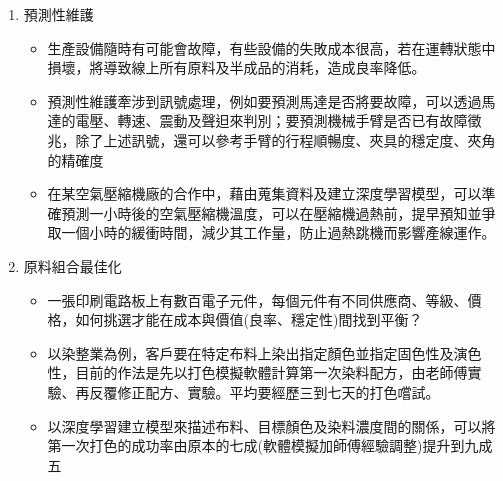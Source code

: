 \documentclass[a4paper,12pt]{article}
\begin{document}
\begin{enumerate}
\begin{itemize}
\end{itemize}
\item 預測性維護
\label{sec:orgee4b1fd}
\begin{itemize}
\item 生產設備隨時有可能會故障，有些設備的失敗成本很高，若在運轉狀態中損壞，將導致線上所有原料及半成品的消耗，造成良率降低。\\
\item 預測性維護牽涉到訊號處理，例如要預測馬達是否將要故障，可以透過馬達的電壓、轉速、震動及聲𨑨來判別；要預測機械手臂是否已有故障徵兆，除了上述訊號，還可以參考手臂的行程順暢度、夾具的穩定度、夾角的精確度\\
\item 在某空氣壓縮機廠的合作中，藉由蒐集資料及建立深度學習模型，可以準確預測一小時後的空氣壓縮機溫度，可以在壓縮機過熱前，提早預知並爭取一個小時的緩衝時間，減少其工作量，防止過熱跳機而影響產線運作。\\
\end{itemize}
\item 原料組合最佳化
\label{sec:org218c2e8}
\begin{itemize}
\item 一張印刷電路板上有數百電子元件，每個元件有不同供應商、等級、價格，如何挑選才能在成本與價值(良率、穩定性)間找到平衡？\\
\item 以染整業為例，客戶要在特定布料上染出指定顏色並指定固色性及演色性，目前的作法是先以打色模擬軟體計算第一次染料配方，由老師傅實驗、再反覆修正配方、實驗。平圴要經歷三到七天的打色嚐試。\\
\item 以深度學習建立模型來描述布料、目標顏色及染料濃度間的關係，可以將第一次打色的成功率由原本的七成(軟體模擬加師傅經驗調整)提升到九成五\\
\end{itemize}
\end{enumerate}
\end{document}
